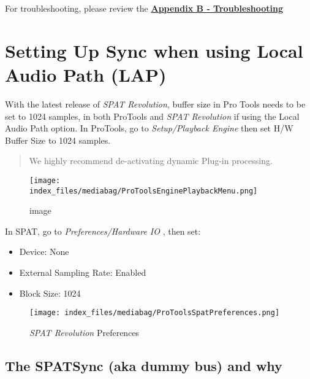 \documentclass[
  letterpaper,
  DIV=11,
  numbers=noendperiod]{scrreport}
\providecommand{\tightlist}{%
  \setlength{\itemsep}{0pt}\setlength{\parskip}{0pt}}\usepackage{longtable,booktabs,array}
\begin{document}
For troubleshooting, please review the
\textbf{\href{Appendix_B.md}{Appendix B - Troubleshooting}}

\hypertarget{setting-up-sync-when-using-local-audio-path-lap}{%
\section{Setting Up Sync when using Local Audio Path
(LAP)}\label{setting-up-sync-when-using-local-audio-path-lap}}

With the latest release of \emph{SPAT Revolution}, buffer size in Pro
Tools needs to be set to 1024 samples, in both ProTools and \emph{SPAT
Revolution} if using the Local Audio Path option. In ProTools, go to
\emph{Setup/Playback Engine} then set H/W Buffer Size to 1024 samples.

\begin{quote}
We highly recommend de-activating dynamic Plug-in processing.
\end{quote}

\begin{figure}

{\centering \texttt{[image: index\_files/mediabag/ProToolsEnginePlaybackMenu.png]}

}

\caption{image}

\end{figure}

In SPAT, go to \emph{Preferences/Hardware IO} , then set:

\begin{itemize}
\tightlist
\item
  Device: None
\item
  External Sampling Rate: Enabled
\item
  Block Size: 1024
\end{itemize}

\begin{figure}

{\centering \texttt{[image: index\_files/mediabag/ProToolsSpatPreferences.png]}

}

\caption{\emph{SPAT Revolution} Preferences}

\end{figure}

\hypertarget{the-spatsync-aka-dummy-bus-and-why}{%
\subsection{The SPATSync (aka dummy bus) and
why}\label{the-spatsync-aka-dummy-bus-and-why}}
\end{document}
